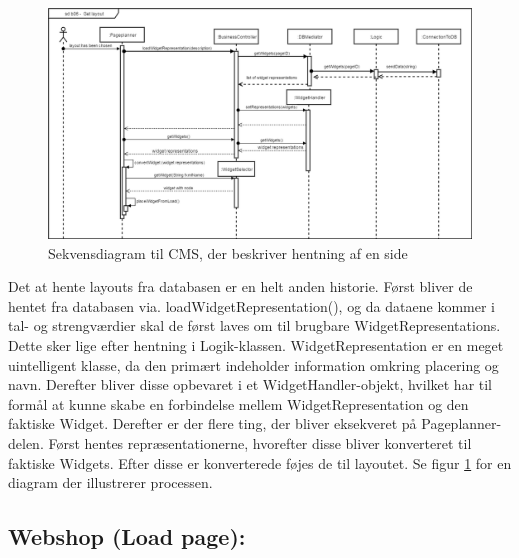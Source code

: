 \begin{figure}[H]
  \includegraphics[width=\linewidth]{elaborationsdokumentet/figurer/analyse/Edit_Diagram.png}
  \caption{Sekvensdiagram til CMS, der beskriver hentning af en side}
  \label{fig:Sekvensdiagram-CMS-editDiagram}
\end{figure}

Det at hente layouts fra databasen er en helt anden historie. Først bliver de hentet fra databasen via. loadWidgetRepresentation(), og da dataene kommer i tal- og strengværdier skal de først laves om til brugbare WidgetRepresentations. Dette sker lige efter hentning i Logik-klassen. WidgetRepresentation er en meget uintelligent klasse, da den primært indeholder information omkring placering og navn. Derefter bliver disse opbevaret i et WidgetHandler-objekt, hvilket har til formål at kunne skabe en forbindelse mellem WidgetRepresentation og den faktiske Widget. Derefter er der flere ting, der bliver eksekveret på Pageplanner-delen. Først hentes repræsentationerne, hvorefter disse bliver konverteret til faktiske Widgets. Efter disse er konverterede føjes de til layoutet. Se figur \ref{fig:Sekvensdiagram-CMS-editDiagram} for en diagram der illustrerer processen.

\subsection{Webshop (Load page):}

